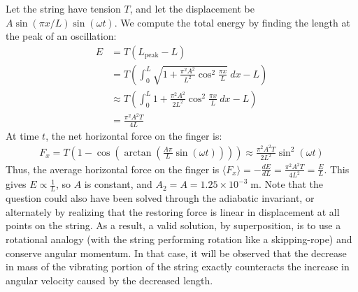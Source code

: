 \begin{solution}
Let the string have tension $T$, and let the displacement be $A\sin(\pi x/L)\sin(\omega t)$. We compute the total energy by finding the length at the peak of an oscillation:
\begin{align*}E&=T(L_{\text{peak}} - L)\\ &=T\left(\int_0^L\sqrt{1 + \frac{\pi^2 A^2}{L^2}\cos^2\frac{\pi x}{L}}\ dx - L\right)\\ &\approx T\left(\int_0^L 1 + \frac{\pi^2 A^2}{2L^2}\cos^2\frac{\pi x}{L}\ dx - L\right)\\ &= \frac{\pi^2 A^2 T}{4L}\end{align*}
At time $t$, the net horizontal force on the finger is:
\begin{align*}F_x = T\left(1 - \cos\left(\arctan\left(\frac{A\pi}{L}\sin(\omega t)\right)\right)\right)\approx \frac{\pi^2 A^2 T}{2L^2}\sin^2(\omega t)\end{align*}
Thus, the average horizontal force on the finger is $\displaystyle \langle F_x\rangle = -\frac{dE}{dL} = \frac{\pi^2 A^2 T}{4L^2} = \frac{E}{L}$. This gives $\displaystyle E \propto \frac{1}{L}$, so $A$ is constant, and $A_2=A=\boxed{1.25\times 10^{-3}\;\mathrm{m}}.$
\newline
\newline
Note that the question could also have been solved through the adiabatic invariant, or alternately by realizing that the restoring force is linear in displacement at all points on the string. As a result, a valid solution, by superposition, is to use a rotational analogy (with the string performing rotation like a skipping-rope) and conserve angular momentum. In that case, it will be observed that the decrease in mass of the vibrating portion of the string exactly counteracts the increase in angular velocity caused by the decreased length.  

\end{solution}